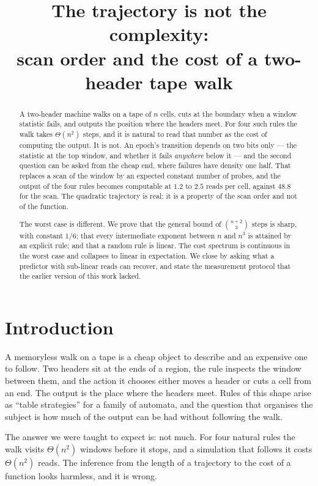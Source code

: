 \documentclass[11pt]{article}
\title{The trajectory is not the complexity:\\[2pt]
scan order and the cost of a two-header tape walk}
\author{}
\date{}
\begin{document}
\maketitle

\begin{abstract}
A two-header machine walks on a tape of $n$ cells, cuts at the boundary when a window
statistic fails, and outputs the position where the headers meet. For four such rules the
walk takes $\Theta(n^2)$ steps, and it is natural to read that number as the cost of
computing the output. It is not. An epoch's transition depends on two bits only --- the
statistic at the top window, and whether it fails \emph{anywhere} below it --- and the
second question can be asked from the cheap end, where failures have density one half.
That replaces a scan of the window by an expected constant number of probes, and the
output of the four rules becomes computable at $1.2$ to $2.5$ reads per cell, against $48.8$
for the scan. The quadratic trajectory is real; it is a property of the scan order and not of
the function.

The worst case is different. We prove that the general bound of $\binom{n+2}{3}$ steps is
sharp, with constant $1/6$; that every intermediate exponent between $n$ and $n^3$ is
attained by an explicit rule; and that a random rule is linear. The cost spectrum is
continuous in the worst case and collapses to linear in expectation. We close by asking
what a predictor with sub-linear reads can recover, and state the measurement protocol
that the earlier version of this work lacked.
\end{abstract}

\section{Introduction}

A memoryless walk on a tape is a cheap object to describe and an expensive one to follow.
Two headers sit at the ends of a region, the rule inspects the window between them, and
the action it chooses either moves a header or cuts a cell from an end. The output is the
place where the headers meet. Rules of this shape arise as ``table strategies'' for a
family of automata, and the question that organises the subject is how much of the output
can be had without following the walk.

The answer we were taught to expect is: not much. For four natural rules the walk visits
$\Theta(n^2)$ windows before it stops, and a simulation that follows it costs
$\Theta(n^2)$ reads. The inference from the length of a trajectory to the cost of a
function looks harmless, and it is wrong.
\end{document}

